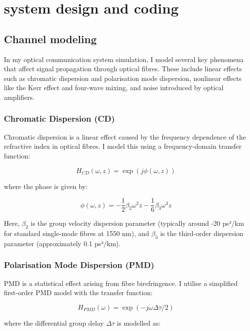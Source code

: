 \documentclass[journal]{IEEEtran}
\begin{document}
\section{system design and coding}

\subsection*{Channel modeling}
In my optical communication system simulation, I model several key phenomena that affect signal propagation through optical fibres. These include linear effects such as chromatic dispersion and polarisation mode dispersion, nonlinear effects like the Kerr effect and four-wave mixing, and noise introduced by optical amplifiers.

\subsubsection{Chromatic Dispersion (CD)}
Chromatic dispersion is a linear effect caused by the frequency dependence of the refractive index in optical fibres. I model this using a frequency-domain transfer function:

\begin{equation}
H_{CD}(\omega, z) = \exp(j\phi(\omega, z))
\end{equation}

where the phase is given by:

\begin{equation}
\phi(\omega, z) = -\frac{1}{2}\beta_2\omega^2z - \frac{1}{6}\beta_3\omega^3z
\end{equation}

Here, $\beta_2$ is the group velocity dispersion parameter (typically around -20 ps²/km for standard single-mode fibres at 1550 nm), and $\beta_3$ is the third-order dispersion parameter (approximately 0.1 ps³/km).

\subsubsection{Polarisation Mode Dispersion (PMD)}
PMD is a statistical effect arising from fibre birefringence. I utilise a simplified first-order PMD model with the transfer function:

\begin{equation}
H_{PMD}(\omega) = \exp(-j\omega\Delta\tau/2)
\end{equation}

where the differential group delay $\Delta\tau$ is modelled as:
\end{document}
